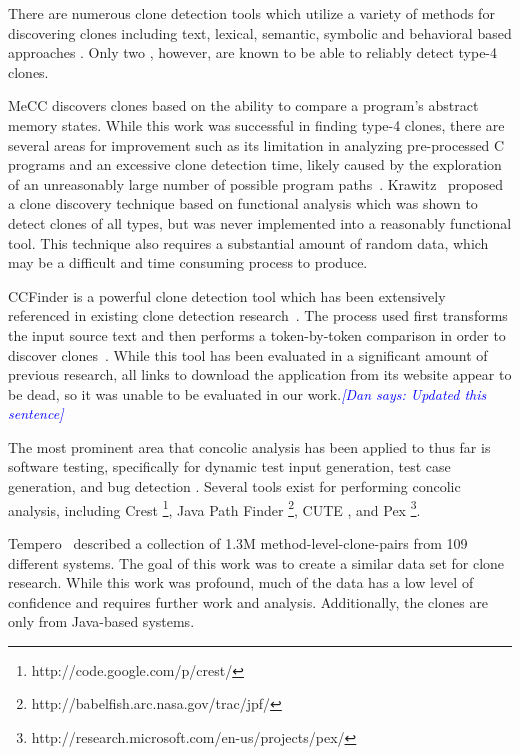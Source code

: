 \documentclass[smallextended]{svjour3}       %
\newcommand{\dan}[1]{\textcolor{blue}{{\it [Dan says: #1]}}}
\begin{document}


There are numerous clone detection tools which utilize a variety of methods for discovering clones including text, lexical, semantic, symbolic and behavioral based approaches \cite{Roy:2009:CEC:1530898.1531101}. Only two , however, are known to be able to reliably detect type-4 clones.

MeCC discovers clones based on the ability to compare a program's abstract memory states. While this work was successful in finding type-4 clones, there are several areas for improvement such as its limitation in analyzing pre-processed C programs and an excessive clone detection time, likely caused by the exploration of an unreasonably large number of possible program paths~\cite{Kim:2011:MMC:1985793.1985835}. Krawitz~\cite{Kraw2012} proposed a clone discovery technique based on functional analysis which was shown to detect clones of all types, but was never implemented into a reasonably functional tool. This technique also requires a substantial amount of random data, which may be a difficult and time consuming process to produce.

CCFinder is a powerful clone detection tool which has been extensively referenced in existing clone detection research~\cite{Kamiya:2001:MST:381473.381749,Choi:2011:ECC:1985404.1985407,Hotta:2010:DCM:1862372.1862390}. The process used first transforms the input source text and then performs a token-by-token comparison in order to discover clones~\cite{Kamiya:2002:CMT:636188.636191}. While this tool has been evaluated in a significant amount of previous research, all links to download the application from its website appear to be dead, so it was unable to be evaluated in our work.\dan{Updated this sentence}

The most prominent area that concolic analysis has been applied to thus far is software testing, specifically for dynamic test input generation, test case generation, and bug detection \cite{Wassermann:2008:DTI:1390630.1390661, Sen:2005:CCU:1081706.1081750, Kim:2012:IAC:2337223.2337373}. Several tools exist for performing concolic analysis, including Crest \footnote{http://code.google.com/p/crest/}, Java Path Finder \footnote{http://babelfish.arc.nasa.gov/trac/jpf/}, CUTE \cite{Sen:2005:CCU:1081706.1081750}, and Pex \footnote{http://research.microsoft.com/en-us/projects/pex/}.

Tempero~\cite{IWSC13p53} described a collection of 1.3M method-level-clone-pairs from 109 different systems. The goal of this work was to create a similar data set for clone research. While this work was profound, much of the data has a low level of confidence and requires further work and analysis. Additionally, the clones are only from Java-based systems.
\end{document}
